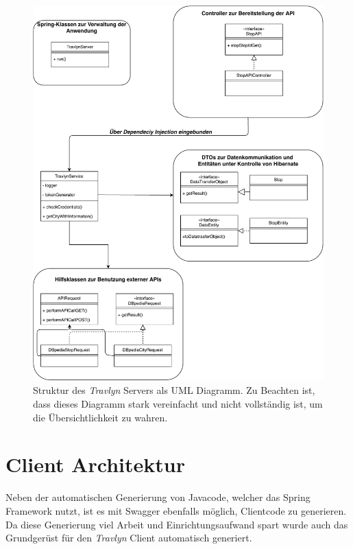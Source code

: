	
	\begin{figure}[ht!]
		\centering
		\includegraphics[width=1\textwidth]{images/UML_Diagram.pdf}
		\caption{Struktur des \textit{Travlyn} Servers als UML Diagramm. Zu Beachten ist, dass dieses Diagramm stark vereinfacht und nicht vollständig ist, um die Übersichtlichkeit zu wahren.}
		\label{fig:UML}
	\end{figure}

	\clearpage

	
	\section{Client Architektur}
	Neben der automatischen Generierung von Javacode, welcher das Spring Framework nutzt, ist es mit Swagger ebenfalls möglich, Clientcode zu generieren. Da diese Generierung viel Arbeit und Einrichtungsaufwand spart wurde auch das Grundgerüst für den \textit{Travlyn} Client automatisch generiert.
	